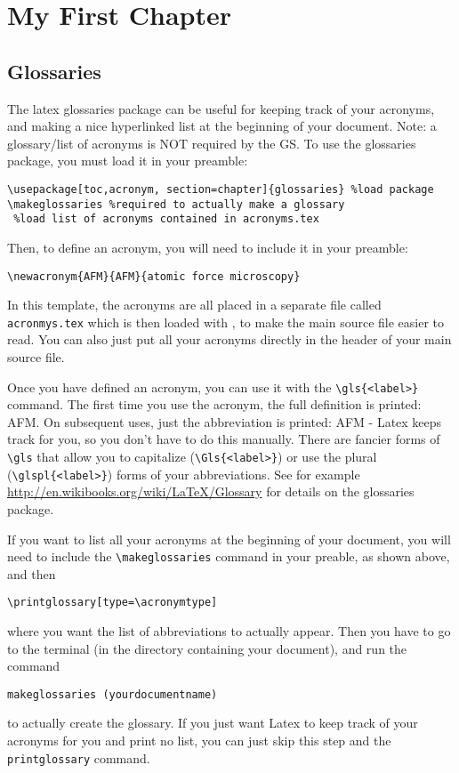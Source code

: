 \chapter{My First Chapter}
\begin{quote}
\lipsum[1]
\end{quote}

\lipsum[1-3]


\section{Glossaries}
The latex glossaries package can be useful for keeping track of your acronyms, and making a nice hyperlinked 
list at the beginning of your document.  Note: a glossary/list of acronyms is NOT required by the GS.
To use the glossaries package, you must load it in your preamble:
\begin{verbatim}
\usepackage[toc,acronym, section=chapter]{glossaries} %load package
\makeglossaries %required to actually make a glossary
 %load list of acronyms contained in acronyms.tex
\end{verbatim}
Then, to define an acronym, you will need to include it in your preamble:
\begin{verbatim}
\newacronym{AFM}{AFM}{atomic force microscopy}
\end{verbatim}
In this template, the acronyms are all placed in a separate file called
\verb#acronmys.tex# which is then loaded with \verb##, to
make the main source file easier to read.  You can also just put all
your acronyms directly in the header of your main source file.

Once you have defined an acronym, you can use it with the \verb#\gls{<label>}# command.
The first time you use the acronym, the full definition is printed: \gls{AFM}.
On subsequent uses, just the abbreviation is printed: \gls{AFM} - Latex keeps track
for you, so you don't have to do this manually.  There are fancier forms
of \verb#\gls# that allow you to capitalize (\verb#\Gls{<label>}#) or use the 
plural (\verb#\glspl{<label>}#) forms of your abbreviations.  See 
for example \url{http://en.wikibooks.org/wiki/LaTeX/Glossary} for details
on the glossaries package.

If you want to list all your acronyms at the beginning of your document, you
will need to include the \verb#\makeglossaries# command in your preable, as
shown above, and then 
\begin{verbatim}
\printglossary[type=\acronymtype]
\end{verbatim}
where you want the list of abbreviations to actually appear.  Then you have
to go to the terminal (in the directory containing your document), and run the command
\begin{verbatim}
makeglossaries (yourdocumentname)
\end{verbatim}
to actually create the glossary.  If you just want Latex to keep track of your acronyms for you 
and print no list, you can just skip this step and the \verb#printglossary# command.

